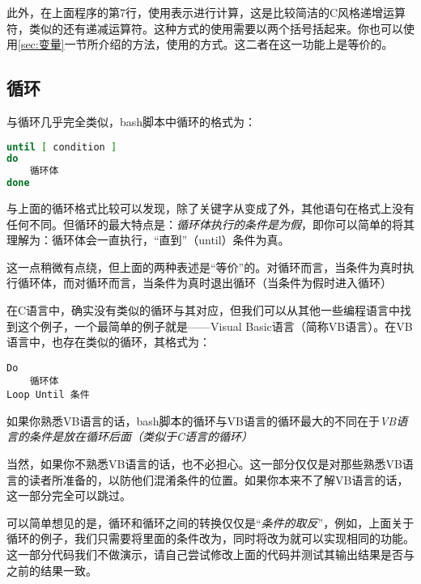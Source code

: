 此外，在上面程序的第7行，使用表示进行计算，这是比较简洁的C风格递增运算符，类似的还有递减运算符\code{--}。这种方式的使用需要以两个括号括起来。你也可以使用\ref{sec:变量}一节所介绍的方法，使用的方式。这二者在这一功能上是等价的。

\subsection{循环}\label{subsec:循环-until循环}

与循环几乎完全类似，bash脚本中循环的格式为：

\begin{lstlisting}[language=bash]
until [ condition ]
do
    循环体
done
\end{lstlisting}

与上面的循环格式比较可以发现，除了关键字从变成了外，其他语句在格式上没有任何不同。但循环的最大特点是：\emph{循环体执行的条件是为假}，即你可以简单的将其理解为：循环体会一直执行，“直到”（until）条件为真。

\begin{attention}
    这一点稍微有点绕，但上面的两种表述是“等价”的。对循环而言，当条件为真时执行循环体，而对循环而言，当条件为真时退出循环（当条件为假时进入循环）
\end{attention}

\begin{extend}
    在C语言中，确实没有类似的循环与其对应，但我们可以从其他一些编程语言中找到这个例子，一个最简单的例子就是——Visual Basic语言（简称VB语言）。在VB语言中，也存在类似的循环，其格式为：

    \begin{lstlisting}
Do 
    循环体
Loop Until 条件
    \end{lstlisting}

    如果你熟悉VB语言的话，bash脚本的循环与VB语言的循环最大的不同在于\emph{VB语言的条件是放在循环后面（类似于C语言的循环）}

    当然，如果你不熟悉VB语言的话，也不必担心。这一部分仅仅是对那些熟悉VB语言的读者所准备的，以防他们混淆条件的位置。如果你本来不了解VB语言的话，这一部分完全可以跳过。
\end{extend}

可以简单想见的是，循环和循环之间的转换仅仅是“\emph{条件的取反}”，例如，上面关于循环的例子，我们只需要将里面的条件改为，同时将改为就可以实现相同的功能。这一部分代码我们不做演示，请自己尝试修改上面的代码并测试其输出结果是否与之前的结果一致。



